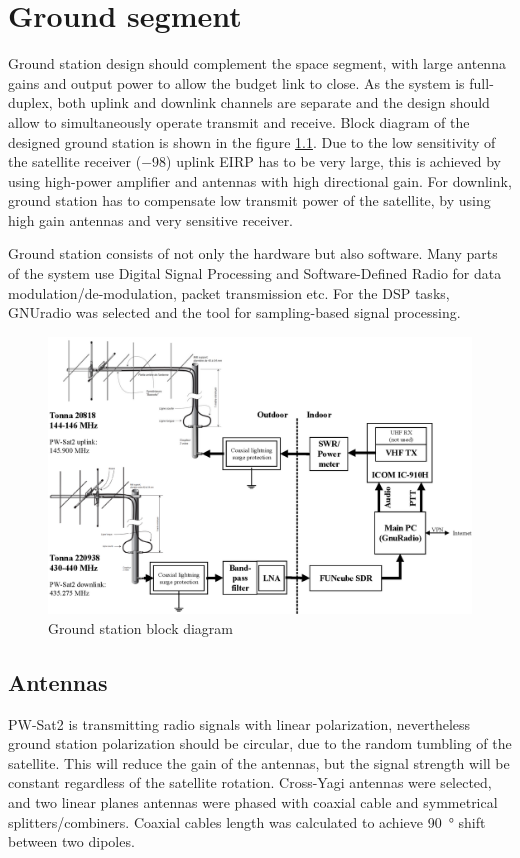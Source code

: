 \chapter{Ground segment}
Ground station design should complement the space segment, with large antenna gains and output power to allow the budget link to close. As the system is full-duplex, both uplink and downlink channels are separate and the design should allow to simultaneously operate transmit and receive. Block diagram of the designed ground station is shown in the figure \ref{gs_block_diagram}.
Due to the low sensitivity of the satellite receiver (\SI{-98}{\dBm}) uplink EIRP has to be very large, this is achieved by using high-power amplifier and antennas with high directional gain. For downlink, ground station has to compensate low transmit power of the satellite, by using high gain antennas and very sensitive receiver.

Ground station consists of not only the hardware but also software. Many parts of the system use Digital Signal Processing and Software-Defined Radio for data modulation/de-modulation, packet transmission etc. For the DSP tasks, GNUradio \cite{gnuradio} was selected and the tool for sampling-based signal processing.



\begin{figure}[H]
    \centering
    \includegraphics[width=0.8\paperwidth]{img/5/gs_block_diagram.eps}
    \caption{Ground station block diagram}
    \label{gs_block_diagram}
\end{figure}


\section{Antennas}
PW-Sat2 is transmitting radio signals with linear polarization, nevertheless ground station  polarization should be circular, due to the random tumbling of the satellite. This will reduce the gain of the antennas, but the signal strength will be constant regardless of the satellite rotation. Cross-Yagi antennas were selected, and two linear planes antennas were phased with coaxial cable and symmetrical splitters/combiners. Coaxial cables length was calculated to achieve \SI{90}{\degree} shift between two dipoles.

